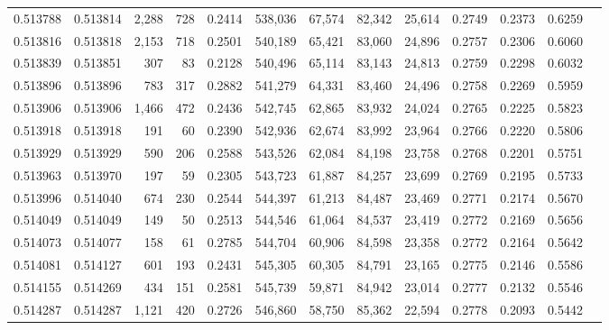 \begin{tabular}{rrrrrrrrrrrrr}
0.513788 & 0.513814 & 2,288 &   728 &                                     0.2414 & 538,036 &  67,574 &  82,342 &  25,614 & 0.2749 & 0.2373 & 0.6259 \\
0.513816 & 0.513818 & 2,153 &   718 &                                     0.2501 & 540,189 &  65,421 &  83,060 &  24,896 & 0.2757 & 0.2306 & 0.6060 \\
0.513839 & 0.513851 &   307 &    83 &                                     0.2128 & 540,496 &  65,114 &  83,143 &  24,813 & 0.2759 & 0.2298 & 0.6032 \\
0.513896 & 0.513896 &   783 &   317 &                                     0.2882 & 541,279 &  64,331 &  83,460 &  24,496 & 0.2758 & 0.2269 & 0.5959 \\
0.513906 & 0.513906 & 1,466 &   472 &                                     0.2436 & 542,745 &  62,865 &  83,932 &  24,024 & 0.2765 & 0.2225 & 0.5823 \\
0.513918 & 0.513918 &   191 &    60 &                                     0.2390 & 542,936 &  62,674 &  83,992 &  23,964 & 0.2766 & 0.2220 & 0.5806 \\
0.513929 & 0.513929 &   590 &   206 &                                     0.2588 & 543,526 &  62,084 &  84,198 &  23,758 & 0.2768 & 0.2201 & 0.5751 \\
0.513963 & 0.513970 &   197 &    59 &                                     0.2305 & 543,723 &  61,887 &  84,257 &  23,699 & 0.2769 & 0.2195 & 0.5733 \\
0.513996 & 0.514040 &   674 &   230 &                                     0.2544 & 544,397 &  61,213 &  84,487 &  23,469 & 0.2771 & 0.2174 & 0.5670 \\
0.514049 & 0.514049 &   149 &    50 &                                     0.2513 & 544,546 &  61,064 &  84,537 &  23,419 & 0.2772 & 0.2169 & 0.5656 \\
0.514073 & 0.514077 &   158 &    61 &                                     0.2785 & 544,704 &  60,906 &  84,598 &  23,358 & 0.2772 & 0.2164 & 0.5642 \\
0.514081 & 0.514127 &   601 &   193 &                                     0.2431 & 545,305 &  60,305 &  84,791 &  23,165 & 0.2775 & 0.2146 & 0.5586 \\
0.514155 & 0.514269 &   434 &   151 &                                     0.2581 & 545,739 &  59,871 &  84,942 &  23,014 & 0.2777 & 0.2132 & 0.5546 \\
0.514287 & 0.514287 & 1,121 &   420 &                                     0.2726 & 546,860 &  58,750 &  85,362 &  22,594 & 0.2778 & 0.2093 & 0.5442 \\

\end{tabular}
